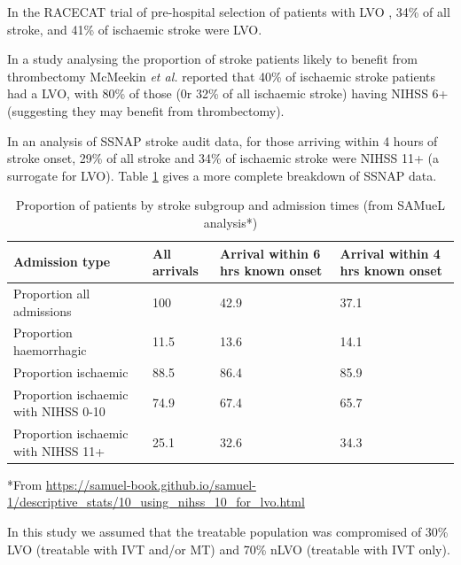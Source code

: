 In the RACECAT trial of pre-hospital selection of patients with LVO \cite{perez_de_la_ossa_effect_2022}, 34\% of all stroke, and 41\% of ischaemic stroke were LVO.

In a study analysing the proportion of stroke patients likely to benefit from thrombectomy McMeekin\textit{ et al.} \cite{mcmeekin_estimating_2017} reported that 40\% of ischaemic stroke patients had a LVO, with 80\% of those (0r 32\% of all ischaemic stroke) having NIHSS 6+ (suggesting they may benefit from thrombectomy). 

In an analysis of SSNAP stroke audit data, for those arriving within 4 hours of stroke onset, 29\% of all stroke and 34\% of ischaemic stroke were NIHSS 11+ (a surrogate for LVO). Table \ref{tab_stroke_type} gives a more complete breakdown of SSNAP data.

\begin{minipage}{1.0\textwidth}
\begin{longtable}[]{p{6.3cm} | p{2.5cm} p{2.5cm} p{2.5cm}}
\caption{Proportion of patients by stroke subgroup and admission times (from SAMueL analysis*)}\label{tab_stroke_type}\\
\toprule
Admission type & All arrivals & Arrival within 6 hrs known onset &
Arrival within 4 hrs known onset \\
\midrule
\endhead
Proportion all admissions & 100 & 42.9 & 37.1 \\
Proportion haemorrhagic & 11.5 & 13.6 & 14.1 \\
Proportion ischaemic & 88.5 & 86.4 & 85.9 \\
Proportion ischaemic with NIHSS 0-10 & 74.9 & 67.4 & 65.7 \\
Proportion ischaemic with NIHSS 11+ & 25.1 & 32.6 & 34.3 \\
\end{longtable}
\footnotesize{*From \url{https://samuel-book.github.io/samuel-1/descriptive_stats/10_using_nihss_10_for_lvo.html}}
 
\end{minipage}

In this study we assumed that the treatable population was compromised of 30\% LVO (treatable with IVT and/or MT) and 70\% nLVO (treatable with IVT only).
